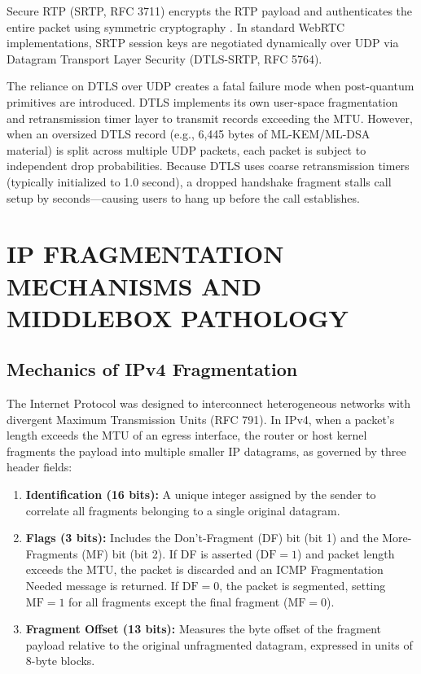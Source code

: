Secure RTP (SRTP, RFC 3711) encrypts the RTP payload and authenticates the entire packet using symmetric cryptography \cite{rfc3711}. In standard WebRTC implementations, SRTP session keys are negotiated dynamically over UDP via Datagram Transport Layer Security (DTLS-SRTP, RFC 5764). 

The reliance on DTLS over UDP creates a fatal failure mode when post-quantum primitives are introduced. DTLS implements its own user-space fragmentation and retransmission timer layer to transmit records exceeding the MTU. However, when an oversized DTLS record (e.g., 6,445 bytes of ML-KEM/ML-DSA material) is split across multiple UDP packets, each packet is subject to independent drop probabilities. Because DTLS uses coarse retransmission timers (typically initialized to 1.0 second), a dropped handshake fragment stalls call setup by seconds—causing users to hang up before the call establishes.

\section{IP FRAGMENTATION MECHANISMS AND MIDDLEBOX PATHOLOGY}

\subsection{Mechanics of IPv4 Fragmentation}
The Internet Protocol was designed to interconnect heterogeneous networks with divergent Maximum Transmission Units (RFC 791). In IPv4, when a packet's length exceeds the MTU of an egress interface, the router or host kernel fragments the payload into multiple smaller IP datagrams, as governed by three header fields:
\begin{enumerate}
    \item \textbf{Identification (16 bits):} A unique integer assigned by the sender to correlate all fragments belonging to a single original datagram.
    \item \textbf{Flags (3 bits):} Includes the Don't-Fragment (DF) bit (bit 1) and the More-Fragments (MF) bit (bit 2). If DF is asserted ($\text{DF}=1$) and packet length exceeds the MTU, the packet is discarded and an ICMP Fragmentation Needed message is returned. If $\text{DF}=0$, the packet is segmented, setting $\text{MF}=1$ for all fragments except the final fragment ($\text{MF}=0$).
    \item \textbf{Fragment Offset (13 bits):} Measures the byte offset of the fragment payload relative to the original unfragmented datagram, expressed in units of 8-byte blocks.
\end{enumerate}

